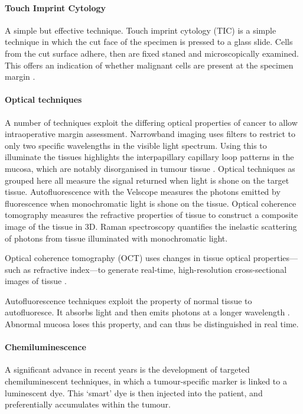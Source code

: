 \paragraph{Touch Imprint Cytology}
A simple but effective technique. 
Touch imprint cytology (TIC) is a simple technique in which the cut face of the specimen is pressed to a glass slide. Cells from the cut surface adhere, then are fixed staned and microscopically examined. This offers an indication of whether malignant cells are present at the specimen margin \cite{naveedDiagnosticAccuracyTouch2017}.


\paragraph{Optical techniques}
A number of techniques exploit the differing optical properties of cancer to allow intraoperative margin assessment.
Narrowband imaging uses filters to restrict to only two specific wavelengths in the visible light spectrum.
Using this to illuminate the tissues highlights the interpapillary capillary loop patterns in the mucosa, which are notably disorganised in tumour tissue \cite{vuEfficacyNarrowBand2014}.
Optical techniques as grouped here all measure the signal returned when light is shone on the target tissue.
Autofluorescence with the Velscope measures the photons emitted by fluorescence when monochromatic light is shone on the tissue.
Optical coherence tomography measures the refractive properties of tissue to construct a composite image of the tissue in 3D.
Raman spectroscopy quantifies the inelastic scattering of photons from tissue illuminated with monochromatic light.

Optical coherence tomography (OCT) uses changes in tissue optical properties---such as refractive index---to generate real-time, high-resolution cross-sectional images of tissue \cite{heidaria.e.UseOpticalCoherence2020}.

Autofluorescence techniques exploit the property of normal tissue to autofluoresce. 
It absorbs light and then emits photons at a longer wavelength \cite{leey.-j.IntraoperativeFluorescenceGuidedSurgery2020}.
Abnormal mucosa loses this property, and can thus be distinguished in real time.

\paragraph{Chemiluminescence}

A significant advance in recent years is the development of targeted chemiluminescent techniques, in which a tumour-specific marker is linked to a luminescent dye. 
This `smart' dye is then injected into the patient, and preferentially accumulates within the tumour. 

